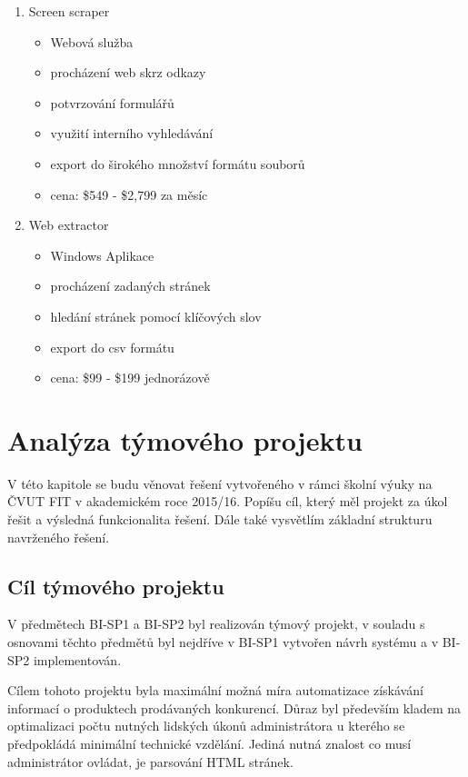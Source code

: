 \documentclass[thesis=B,czech]{FITthesis}[2012/06/26]
\begin{document}
\begin{enumerate}
\item Screen scraper \cite{ScreenScraper}

  \begin{itemize}
    \item Webová služba
    \item procházení web skrz odkazy
    \item potvrzování formulářů
    \item využití interního vyhledávání
    \item export do širokého množství formátu souborů
    \item cena: \$549 - \$2,799 za měsíc
  \end{itemize}
  
\item Web extractor \cite{WebExtractor}

  \begin{itemize}
    \item Windows Aplikace
    \item procházení zadaných stránek
    \item hledání stránek pomocí klíčových slov
    \item export do csv formátu
    \item cena: \$99 - \$199 jednorázově
  \end{itemize}


\end{enumerate}

\newpage

\chapter{Analýza týmového projektu}
V této kapitole se budu věnovat řešení vytvořeného v rámci školní výuky na ČVUT FIT v akademickém roce 2015/16.
Popíšu cíl, který měl projekt za úkol řešit a výsledná funkcionalita řešení. Dále také vysvětlím základní strukturu
navrženého řešení.

\section{Cíl týmového projektu}

V předmětech BI-SP1 a BI-SP2 byl realizován týmový projekt, v souladu s osnovami těchto předmětů byl nejdříve v BI-SP1 vytvořen návrh
systému a v BI-SP2 implementován.
\par
Cílem tohoto projektu byla maximální možná míra automatizace získávání informací o produktech prodávaných konkurencí. Důraz byl především kladem na optimalizaci počtu nutných lidských úkonů administrátora u kterého se předpokládá minimální technické vzdělání.
Jediná nutná znalost co musí administrátor ovládat, je parsování HTML stránek.
\par
\end{document}
